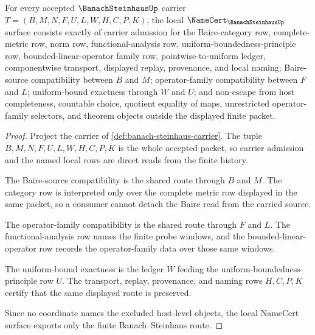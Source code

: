\begin{theorem}
\label{thm:banach-steinhaus-namecert-obligations}
For every accepted $\BanachSteinhausUp$ carrier $T=(B,M,N,F,U,L,W,H,C,P,K)$, the local $\NameCert_{\BanachSteinhausUp}$ surface consists exactly of carrier admission for the Baire-category row, complete-metric row, norm row, functional-analysis row, uniform-boundedness-principle row, bounded-linear-operator family row, pointwise-to-uniform ledger, componentwise transport, displayed replay, provenance, and local naming; Baire-source compatibility between $B$ and $M$; operator-family compatibility between $F$ and $L$; uniform-bound exactness through $W$ and $U$; and non-escape from host completeness, countable choice, quotient equality of maps, unrestricted operator-family selectors, and theorem objects outside the displayed finite packet.
\end{theorem}
\begin{proof}
Project the carrier of \autoref{def:banach-steinhaus-carrier}. The tuple $B,M,N,F,U,L,W,H,C,P,K$ is the whole accepted packet, so carrier admission and the named local rows are direct reads from the finite history.

The Baire-source compatibility is the shared route through $B$ and $M$. The category row is interpreted only over the complete metric row displayed in the same packet, so a consumer cannot detach the Baire read from the carried source.

The operator-family compatibility is the shared route through $F$ and $L$. The functional-analysis row names the finite probe windows, and the bounded-linear-operator row records the operator-family data over those same windows.

The uniform-bound exactness is the ledger $W$ feeding the uniform-boundedness-principle row $U$. The transport, replay, provenance, and naming rows $H,C,P,K$ certify that the same displayed route is preserved.

Since no coordinate names the excluded host-level objects, the local NameCert surface exports only the finite Banach--Steinhaus route.
\end{proof}

